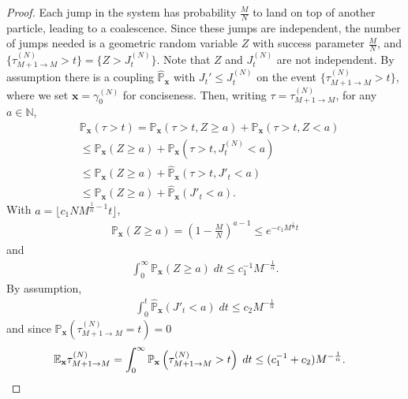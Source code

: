 \documentclass[11pt,a4paper]{scrartcl}
\numberwithin{equation}{section}
\theoremstyle{plain}
\theoremstyle{definition}
\theoremstyle{remark}
\newcommand{\bE}{\ensuremath{\mathbb{E}}}
\newcommand{\bN}{\ensuremath{\mathbb{N}}}
\newcommand{\bP}{\ensuremath{\mathbb{P}}}
\newcommand{\hP}{\widehat{\bP}}
\newcommand{\bfx}{\mathbf{x}}
\newcommand{\super}[1]{{(#1)}}
\begin{document}
\begin{proof}
	Each jump in the system has probability $\frac{M}{N}$ to land on top of another particle, leading to a coalescence. Since these jumps are independent, the number of jumps needed is a geometric random variable $Z$ with success parameter $\frac{M}{N}$, and $\{\tau^\super{N}_{M+1\to M}>t\} = \{Z>J^\super{N}_t\}$. Note that $Z$ and $J^\super{N}_t$ are not independent. By assumption there is a coupling $\hP_\bfx$ with $J_t' \leq J_t^\super{N}$ on the event $\{\tau^\super{N}_{M+1\to M}>t\}$, where we set $\bfx=\gamma_0^{(N)}$ for conciseness. Then, writing $\tau = \tau^\super{N}_{M+1\to M}$, for any $a\in\bN$, 
	\begin{align}
		&\bP_\bfx \left( \tau>t \right) = \bP_\bfx\left( \tau>t, Z \geq a \right) + \bP_\bfx\left( \tau>t, Z<a\right)    \\
		&\leq \bP_\bfx\left( Z \geq a \right) + \bP_\bfx\left( \tau>t, J^\super{N}_t<a\right)    \\
		&\leq \bP_\bfx\left( Z \geq a \right) + \hP_\bfx\left( \tau>t, J'_t<a\right)    \\
		&\leq \bP_\bfx\left( Z \geq a \right) + \hP_\bfx\left(J'_t<a\right).
	\end{align}
	With $a=\lfloor c_1 NM^{\frac1\alpha -1}t \rfloor$,
	\begin{align}
		\bP_\bfx\left( Z \geq a \right) = \left(1-\frac{M}{N}\right)^{a-1}
		\leq e^{-c_1 M^{\frac1\alpha}t}
	\end{align}
	and 
	\begin{align}
		\int_0^\infty \bP_\bfx\left( Z \geq a \right) \;dt \leq c_1^{-1}M^{-\frac1\alpha}.
	\end{align}
	By assumption, 
	\begin{align}
		\int_0^t \hP_\bfx\left(J'_t<a\right) \;dt \leq c_2 M^{-\frac1\alpha}
	\end{align}
	and since $\bP_\bfx (\tau^\super{N}_{M+1\to M} =t )=0$
	\begin{align}
		&\bE_\bfx \tau^\super{N}_{M+1\to M} = \int_0^\infty \bP_\bfx \left(\tau^\super{N}_{M+1\to M} >t \right)\;dt \leq (c_1^{-1}+c_2)M^{-\frac1\alpha}. \qedhere
	\end{align}
\end{proof}
\end{document}
